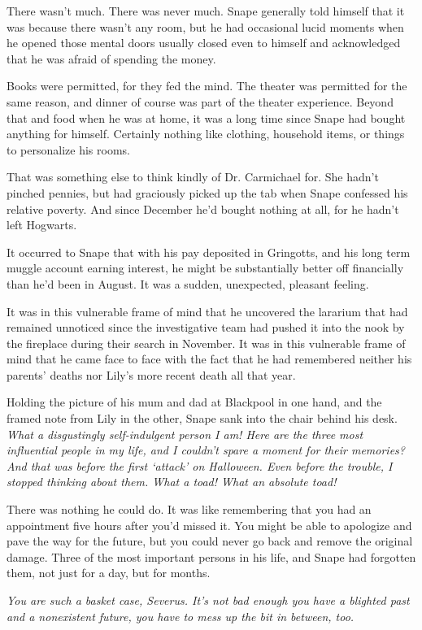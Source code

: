 There wasn't much. There was never much. Snape generally told himself that it was because there wasn't any room, but he had occasional lucid moments when he opened those mental doors usually closed even to himself and acknowledged that he was afraid of spending the money.

Books were permitted, for they fed the mind. The theater was permitted for the same reason, and dinner of course was part of the theater experience. Beyond that and food when he was at home, it was a long time since Snape had bought anything for himself. Certainly nothing like clothing, household items, or things to personalize his rooms.

That was something else to think kindly of Dr. Carmichael for. She hadn't pinched pennies, but had graciously picked up the tab when Snape confessed his relative poverty. And since December he'd bought nothing at all, for he hadn't left Hogwarts.

It occurred to Snape that with his pay deposited in Gringotts, and his long term muggle account earning interest, he might be substantially better off financially than he'd been in August. It was a sudden, unexpected, pleasant feeling.

It was in this vulnerable frame of mind that he uncovered the lararium that had remained unnoticed since the investigative team had pushed it into the nook by the fireplace during their search in November. It was in this vulnerable frame of mind that he came face to face with the fact that he had remembered neither his parents' deaths nor Lily's more recent death all that year.

Holding the picture of his mum and dad at Blackpool in one hand, and the framed note from Lily in the other, Snape sank into the chair behind his desk. \emph{What a disgustingly self-indulgent person I am! Here are the three most influential people in my life, and I couldn't spare a moment for their memories? And that was before the first `attack' on Halloween. Even before the trouble, I stopped thinking about them. What a toad! What an absolute toad!}

There was nothing he could do. It was like remembering that you had an appointment five hours after you'd missed it. You might be able to apologize and pave the way for the future, but you could never go back and remove the original damage. Three of the most important persons in his life, and Snape had forgotten them, not just for a day, but for months.

\emph{You are such a basket case, Severus. It's not bad enough you have a blighted past and a nonexistent future, you have to mess up the bit in between, too.}

